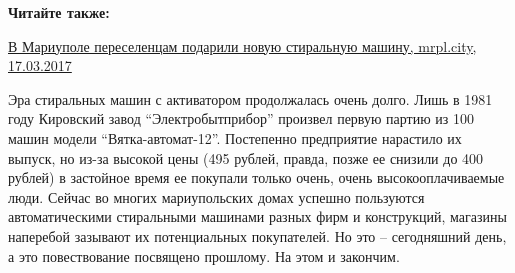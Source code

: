 \vspace{0.5cm}
\begin{minipage}{0.9\textwidth}
\textbf{Читайте также:} 

\href{https://mrpl.city/news/view/mariupol-podaril-pereselentsam-novuyu-stiralnuyu-mashinu}{%
В Мариуполе переселенцам подарили новую стиральную машину, mrpl.city, 17.03.2017}
\end{minipage}
\vspace{0.5cm}

Эра стиральных машин с активатором продолжалась очень долго. Лишь в 1981 году
Кировский завод \enquote{Электробытприбор} произвел первую партию из 100 машин модели
\enquote{Вятка-автомат-12}. Постепенно предприятие нарастило их выпуск, но из-за
высокой цены (495 рублей, правда, позже ее снизили до 400 рублей) в застойное
время ее покупали только очень, очень высокооплачиваемые люди. Сейчас во многих
мариупольских домах успешно пользуются автоматическими стиральными машинами
разных фирм и конструкций, магазины наперебой зазывают их потенциальных
покупателей. Но это – сегодняшний день, а это повествование посвящено прошлому.
На этом и закончим.
